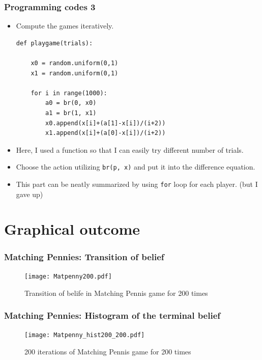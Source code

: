 \documentclass[dvipdfmx,fleqn]{beamer}
\begin{document}
\begin{frame}[fragile]
\frametitle{Programming codes 3}
\begin{itemize}\setlength{\parskip}{0.5em}
\item
Compute the games iteratively.
\scriptsize
\begin{verbatim}
def playgame(trials):

    x0 = random.uniform(0,1)
    x1 = random.uniform(0,1)

    for i in range(1000):
        a0 = br(0, x0)
        a1 = br(1, x1)
        x0.append(x[i]+(a[1]-x[i])/(i+2))
        x1.append(x[i]+(a[0]-x[i])/(i+2))
\end{verbatim}
\normalsize

\item
Here, I used a function so that I can easily try different number of trials.
\item
Choose the action utilizing \texttt{br(p, x)} and put it into the difference equation.

\item
This part can be neatly summarized by using \texttt{for} loop for each player. (but I gave up)

\end{itemize}
\end{frame}


\section{Graphical outcome}
\begin{frame}
\frametitle{Matching Pennies: Transition of belief}
\begin{figure}
 \centering
 \texttt{[image: Matpenny200.pdf]}
 \caption{Transition of belife in Matching Pennis game for 200 times}
 \label{fig:Matpenny200}
\end{figure}
\end{frame}

\begin{frame}
\frametitle{Matching Pennies: Histogram of the terminal belief}
\begin{figure}
 \centering
 \texttt{[image: Matpenny\_hist200\_200.pdf]}
 \caption{200 iterations of Matching Pennis game for 200 times}
 \label{fig:Matpenny_hist200_200}
\end{figure}
\end{frame}
\end{document}
